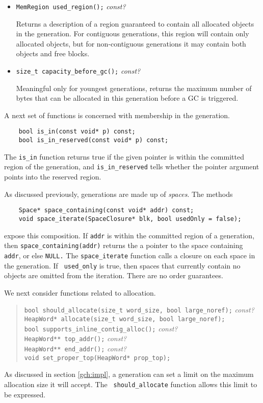\documentclass{article}
\begin{document}
\begin{itemize}
\item {\tt MemRegion used\_region();} {\em const?}

Returns a description of a region guaranteed to contain all allocated
objects in the generation.  For contiguous generations, this region
will contain only allocated objects, but for non-contiguous
generations it may contain both objects and free blocks.

\item {\tt size\_t capacity\_before\_gc();} {\em const?}

Meaningful only for youngest generations, returns the maximum number
of bytes that can be allocated in this generation before a GC is
triggered.  
\end{itemize}

A next set of functions is concerned with membership in the
generation.
\begin{verbatim}
    bool is_in(const void* p) const;
    bool is_in_reserved(const void* p) const;
\end{verbatim}
The {\tt is\_in} function returns true if the given pointer is within
the committed region of the generation, and {\tt is\_in\_reserved} tells
whether the pointer argument points into the reserved region.

As discussed previously, generations are made up of {\em spaces}.  The
methods
\begin{verbatim}
    Space* space_containing(const void* addr) const;
    void space_iterate(SpaceClosure* blk, bool usedOnly = false);
\end{verbatim}
expose this composition.  If {\tt addr} is within the committed region
of a generation, then {\tt space\_containing(addr)} returns the a
pointer to the space containing {\tt addr}, or else {\tt NULL.}
The {\tt space\_iterate}
function calls a closure on each space in the generation.  If {\tt
used\_only} is true, then spaces that currently contain no objects are
omitted from the iteration.  There are no order guarantees.

We next consider functions related to allocation.
\begin{quote}
    {\tt bool should\_allocate(size\_t word\_size, bool large\_noref);} {\em const?} \\
    {\tt HeapWord* allocate(size\_t word\_size, bool large\_noref);} \\

    {\tt bool supports\_inline\_contig\_alloc();} {\em const?} \\
    {\tt HeapWord** top\_addr();} {\em const?} \\
    {\tt HeapWord** end\_addr();} {\em const?} \\
    {\tt void       set\_proper\_top(HeapWord* prop\_top);}
\end{quote}
As discussed in section \ref{gch:impl}, a generation can set a limit
on the maximum allocation size it will accept.  The {\tt
should\_allocate} function allows this limit to be expressed.
\end{document}
